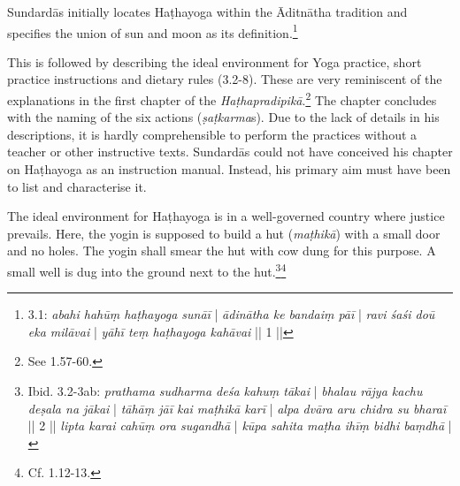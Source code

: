 Sundardās initially locates Haṭhayoga within the Āditnātha tradition and specifies the union of sun and moon as its definition.\footnote{ 3.1: \textit{abahi hahūṃ haṭhayoga sunāī} | \textit{ādinātha ke bandaiṃ pāī} | \textit{ravi śaśi doū eka milāvai} | \textit{yāhī teṃ haṭhayoga kahāvai} || 1 ||}

This is followed by describing the ideal environment for Yoga practice, short practice instructions and dietary rules (3.2-8). These are very reminiscent of the explanations in the first chapter of the \textit{Haṭhapradipikā}.\footnote{See  1.57-60.} The chapter concludes with the naming of the six actions (\textit{ṣaṭkarma}s). Due to the lack of details in his descriptions, it is hardly comprehensible to perform the practices without a teacher or other instructive texts. Sundardās could not have conceived his chapter on Haṭhayoga as an instruction manual. Instead, his primary aim must have been to list and characterise it.

The ideal environment for Haṭhayoga is in a well-governed country where justice prevails. Here, the yogin is supposed to build a hut (\textit{maṭhikā}) with a small door and no holes. The yogin shall smear the hut with cow dung for this purpose. A small well is dug into the ground next to the hut.\footnote{Ibid. 3.2-3ab: \textit{prathama sudharma deśa kahuṃ tākai} | \textit{bhalau rājya kachu deṣala na jākai} | \textit{tāhāṃ jāī kai maṭhikā karī} | \textit{alpa dvāra aru chidra su bharaī} || 2 || \textit{lipta karai cahūṃ ora sugandhā} | \textit{kūpa sahita maṭha ihīṃ bidhi baṃdhā} |}\footnote{Cf.  1.12-13.}

